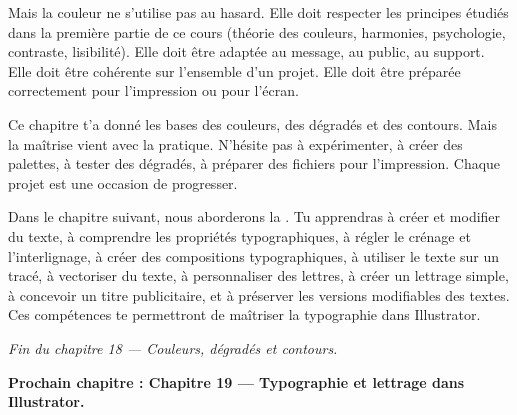Mais la couleur ne s'utilise pas au hasard. Elle doit respecter les principes étudiés dans la première partie de ce cours (théorie des couleurs, harmonies, psychologie, contraste, lisibilité). Elle doit être adaptée au message, au public, au support. Elle doit être cohérente sur l'ensemble d'un projet. Elle doit être préparée correctement pour l'impression ou pour l'écran.

Ce chapitre t'a donné les bases des couleurs, des dégradés et des contours. Mais la maîtrise vient avec la pratique. N'hésite pas à expérimenter, à créer des palettes, à tester des dégradés, à préparer des fichiers pour l'impression. Chaque projet est une occasion de progresser.

Dans le chapitre suivant, nous aborderons la . Tu apprendras à créer et modifier du texte, à comprendre les propriétés typographiques, à régler le crénage et l'interlignage, à créer des compositions typographiques, à utiliser le texte sur un tracé, à vectoriser du texte, à personnaliser des lettres, à créer un lettrage simple, à concevoir un titre publicitaire, et à préserver les versions modifiables des textes. Ces compétences te permettront de maîtriser la typographie dans Illustrator.

\vspace{2em}

\begin{center}
\textit{Fin du chapitre 18 --- Couleurs, dégradés et contours.}

\vspace{1em}

\textbf{Prochain chapitre : Chapitre 19 --- Typographie et lettrage dans Illustrator.}
\end{center}
